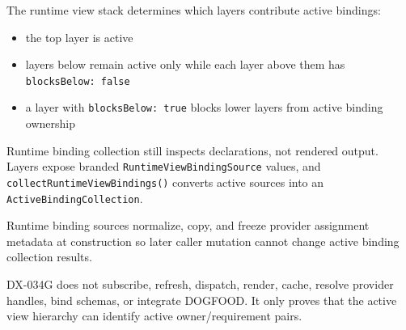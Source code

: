 The runtime view stack determines which layers contribute active bindings:

\begin{itemize}
\tightlist
\item
  the top layer is active
\item
  layers below remain active only while each layer above them has \texttt{b\allowbreak{}l\allowbreak{}o\allowbreak{}c\allowbreak{}k\allowbreak{}s\allowbreak{}B\allowbreak{}e\allowbreak{}l\allowbreak{}o\allowbreak{}w\allowbreak{}:\allowbreak{} \allowbreak{}f\allowbreak{}a\allowbreak{}l\allowbreak{}s\allowbreak{}e}
\item
  a layer with \texttt{b\allowbreak{}l\allowbreak{}o\allowbreak{}c\allowbreak{}k\allowbreak{}s\allowbreak{}B\allowbreak{}e\allowbreak{}l\allowbreak{}o\allowbreak{}w\allowbreak{}:\allowbreak{} \allowbreak{}t\allowbreak{}r\allowbreak{}u\allowbreak{}e} blocks lower layers from active binding ownership
\end{itemize}

Runtime binding collection still inspects declarations, not rendered output. Layers expose branded \texttt{R\allowbreak{}u\allowbreak{}n\allowbreak{}t\allowbreak{}i\allowbreak{}m\allowbreak{}e\allowbreak{}V\allowbreak{}i\allowbreak{}e\allowbreak{}w\allowbreak{}B\allowbreak{}i\allowbreak{}n\allowbreak{}d\allowbreak{}i\allowbreak{}n\allowbreak{}g\allowbreak{}S\allowbreak{}o\allowbreak{}u\allowbreak{}r\allowbreak{}c\allowbreak{}e} values, and \texttt{c\allowbreak{}o\allowbreak{}l\allowbreak{}l\allowbreak{}e\allowbreak{}c\allowbreak{}t\allowbreak{}R\allowbreak{}u\allowbreak{}n\allowbreak{}t\allowbreak{}i\allowbreak{}m\allowbreak{}e\allowbreak{}V\allowbreak{}i\allowbreak{}e\allowbreak{}w\allowbreak{}B\allowbreak{}i\allowbreak{}n\allowbreak{}d\allowbreak{}i\allowbreak{}n\allowbreak{}g\allowbreak{}s\allowbreak{}(\allowbreak{})} converts active sources into an \texttt{A\allowbreak{}c\allowbreak{}t\allowbreak{}i\allowbreak{}v\allowbreak{}e\allowbreak{}B\allowbreak{}i\allowbreak{}n\allowbreak{}d\allowbreak{}i\allowbreak{}n\allowbreak{}g\allowbreak{}C\allowbreak{}o\allowbreak{}l\allowbreak{}l\allowbreak{}e\allowbreak{}c\allowbreak{}t\allowbreak{}i\allowbreak{}o\allowbreak{}n}.

Runtime binding sources normalize, copy, and freeze provider assignment metadata at construction so later caller mutation cannot change active binding collection results.

DX-034G does not subscribe, refresh, dispatch, render, cache, resolve provider handles, bind schemas, or integrate DOGFOOD. It only proves that the active view hierarchy can identify active owner/requirement pairs.

